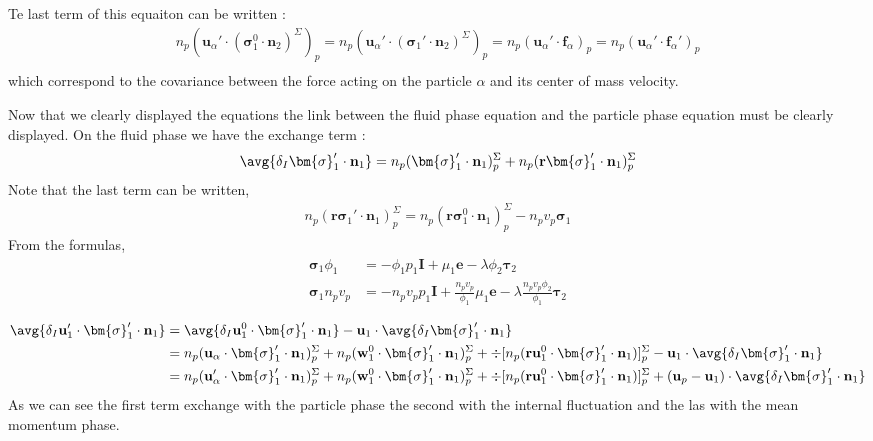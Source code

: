 Te last term of this equaiton can be written : 
\begin{multline*}
    n_p (\textbf{u}_\alpha' \cdot (\bm{\sigma}_1^0 \cdot  \textbf{n}_2)^\Sigma)_p
    = n_p (\textbf{u}_\alpha' \cdot (\bm{\sigma}_1' \cdot  \textbf{n}_2)^\Sigma)_p
    = n_p (\textbf{u}_\alpha' \cdot \textbf{f}_\alpha)_p
    = n_p (\textbf{u}_\alpha' \cdot \textbf{f}_\alpha')_p
    \\
\end{multline*}
which correspond to the covariance between the force acting on the particle $\alpha$ and its center of mass velocity. 


Now that we clearly displayed the equations the link between the fluid phase equation and the particle phase equation must be clearly displayed. 
On the fluid phase we have the exchange term : 
\begin{align*}
    \avg{\delta_I \bm{\sigma}_1'\cdot \textbf{n}_1}
    = n_p (\bm{\sigma}_1'\cdot \textbf{n}_1)_p^\Sigma
    + n_p (\textbf{r} \bm{\sigma}_1'\cdot \textbf{n}_1)_p^\Sigma
\end{align*}
Note that the last term can be written, 
\begin{align*}
    n_p (\textbf{r} \bm{\sigma}_1'\cdot \textbf{n}_1)_p^\Sigma
    = 
    n_p (\textbf{r} \bm{\sigma}_1^0\cdot \textbf{n}_1)_p^\Sigma
    - n_p v_p \bm{\sigma}_1 
\end{align*}
From the formulas, 
\begin{align*}
    \bm{\sigma}_1 \phi_1
    &=- \phi_1 p_1 \textbf{I}
    + \mu_1 \textbf{e}
    - \lambda \phi_2 \bm{\tau}_2\\
    \bm{\sigma}_1 n_p v_p 
    &=- n_p v_p p_1 \textbf{I}
    + \frac{n_p v_p}{\phi_1}\mu_1 \textbf{e}
    - \lambda \frac{n_pv_p\phi_2}{\phi_1} \bm{\tau}_2
\end{align*}

\begin{align*}
    \avg{\delta_I \textbf{u}_1' \cdot \bm{\sigma}_1' \cdot \textbf{n}_1}
    &= 
    \avg{\delta_I \textbf{u}_1^0 \cdot \bm{\sigma}_1' \cdot \textbf{n}_1}
    - \textbf{u}_1 \cdot \avg{\delta_I  \bm{\sigma}_1' \cdot \textbf{n}_1}\\
    &= 
    n_p( \textbf{u}_\alpha \cdot \bm{\sigma}_1' \cdot \textbf{n}_1)^\Sigma_p
    + n_p( \textbf{w}_1^0 \cdot \bm{\sigma}_1' \cdot \textbf{n}_1)^\Sigma_p
    + \div [n_p( \textbf{r}\textbf{u}_1^0 \cdot \bm{\sigma}_1' \cdot \textbf{n}_1)]^\Sigma_p
    - \textbf{u}_1 \cdot \avg{\delta_I  \bm{\sigma}_1' \cdot \textbf{n}_1} \\
    &= 
    n_p( \textbf{u}_\alpha' \cdot \bm{\sigma}_1' \cdot \textbf{n}_1)^\Sigma_p
    + n_p( \textbf{w}_1^0 \cdot \bm{\sigma}_1' \cdot \textbf{n}_1)^\Sigma_p
    + \div [n_p( \textbf{r}\textbf{u}_1^0 \cdot \bm{\sigma}_1' \cdot \textbf{n}_1)]^\Sigma_p
    + (\textbf{u}_p - \textbf{u}_1 )\cdot \avg{\delta_I  \bm{\sigma}_1' \cdot \textbf{n}_1} \\
\end{align*}
As we can see the first term exchange with the particle phase the second with the internal fluctuation and the las with the mean momentum phase. 

